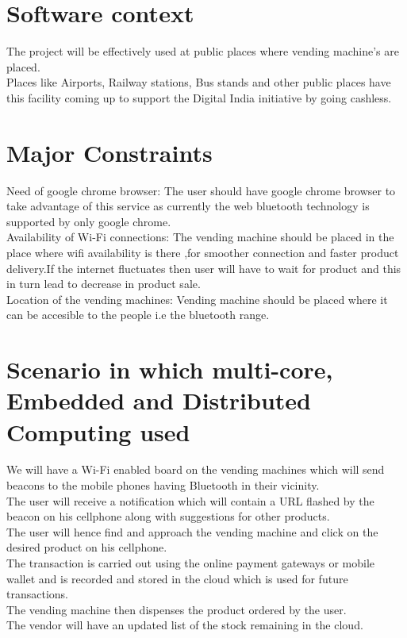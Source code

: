 \documentclass[oneside,a4paper,12pt]{report}
\begin{document}
\section{Software context}
The project will be effectively used at public places where vending machine's are placed.\\
Places like Airports, Railway stations, Bus stands and other public places have this facility coming up to support the Digital India initiative by going cashless.\\

\section{Major Constraints}
Need of google chrome browser: The user should have google chrome browser to take advantage of this service as currently the web bluetooth technology is supported by only google chrome. \\
Availability of Wi-Fi connections: The vending machine should be placed in the place where wifi availability is there ,for smoother connection and faster product delivery.If the internet fluctuates then user will have to wait for product and this in turn lead to decrease in product sale.\\
Location of the vending machines: Vending machine should be placed where it can be accesible to the people i.e the bluetooth range.\\

\section{Scenario in which multi-core, Embedded and Distributed Computing used}

We will have a Wi-Fi enabled board on the vending machines which will send beacons to the mobile phones having Bluetooth in their vicinity.\\
The user will receive a notification which will contain a URL flashed by the beacon on his cellphone along with suggestions for other products.\\
The user will hence find and approach the vending machine and click on the desired product on his cellphone.\\
The transaction is carried out using the online payment gateways or mobile wallet and is recorded and stored in the cloud which is used for future transactions.\\
The vending machine then dispenses the product ordered by the user.\\
The vendor will have an updated list of the stock remaining in the cloud.
\end{document}
